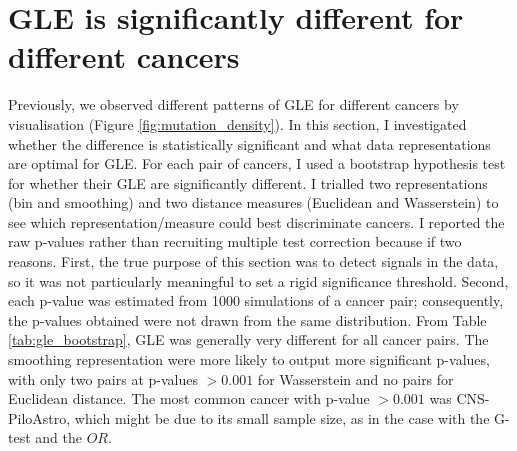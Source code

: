\section{GLE is significantly different for different cancers}\label{gle:bootstrap}
Previously, we observed different patterns of GLE for different cancers by visualisation (Figure \ref{fig:mutation_density}). In this section, I investigated whether the difference is statistically significant and what data representations are optimal for GLE. For each pair of cancers, I used a bootstrap hypothesis test for whether their GLE are significantly different. I trialled two representations (bin and smoothing) and two distance measures (Euclidean and Wasserstein) to see which representation/measure could best discriminate cancers. I reported the raw p-values rather than recruiting multiple test correction because if two reasons. First, the true purpose of this section was to detect signals in the data, so it was not particularly meaningful to set a rigid significance threshold. Second, each p-value was estimated from 1000 simulations of a cancer pair; consequently, the p-values obtained were not drawn from the same distribution. From Table \ref{tab:gle_bootstrap}, GLE was generally very different for all cancer pairs. The smoothing representation were more likely to output more significant p-values, with only two pairs at p-values $>0.001$ for Wasserstein and no pairs for Euclidean distance. The most common cancer with p-value $>0.001$ was CNS-PiloAstro, which might be due to its small sample size, as in the case with the G-test and the $OR$. 



